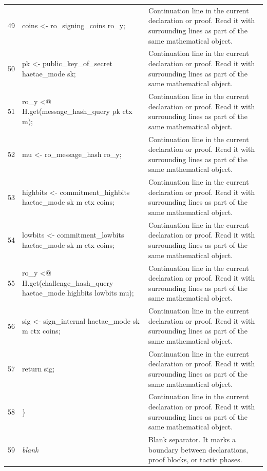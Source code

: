 \documentclass[10pt]{article}
\begin{document}
\begin{longtable}{r L{0.53\textwidth} L{0.37\textwidth}}
49 & {\ttfamily\scriptsize     coins <- ro\_signing\_coins ro\_y;} & Continuation line in the current declaration or proof.  Read it with surrounding lines as part of the same mathematical object. \\
50 & {\ttfamily\scriptsize     pk <- public\_key\_of\_secret haetae\_mode sk;} & Continuation line in the current declaration or proof.  Read it with surrounding lines as part of the same mathematical object. \\
51 & {\ttfamily\scriptsize     ro\_y <@ H.get(message\_hash\_query pk ctx m);} & Continuation line in the current declaration or proof.  Read it with surrounding lines as part of the same mathematical object. \\
52 & {\ttfamily\scriptsize     mu <- ro\_message\_hash ro\_y;} & Continuation line in the current declaration or proof.  Read it with surrounding lines as part of the same mathematical object. \\
53 & {\ttfamily\scriptsize     highbits <- commitment\_highbits haetae\_mode sk m ctx coins;} & Continuation line in the current declaration or proof.  Read it with surrounding lines as part of the same mathematical object. \\
54 & {\ttfamily\scriptsize     lowbits <- commitment\_lowbits haetae\_mode sk m ctx coins;} & Continuation line in the current declaration or proof.  Read it with surrounding lines as part of the same mathematical object. \\
55 & {\ttfamily\scriptsize     ro\_y <@ H.get(challenge\_hash\_query haetae\_mode highbits lowbits mu);} & Continuation line in the current declaration or proof.  Read it with surrounding lines as part of the same mathematical object. \\
56 & {\ttfamily\scriptsize     sig <- sign\_internal haetae\_mode sk m ctx coins;} & Continuation line in the current declaration or proof.  Read it with surrounding lines as part of the same mathematical object. \\
57 & {\ttfamily\scriptsize     return sig;} & Continuation line in the current declaration or proof.  Read it with surrounding lines as part of the same mathematical object. \\
58 & {\ttfamily\scriptsize   \}} & Continuation line in the current declaration or proof.  Read it with surrounding lines as part of the same mathematical object. \\
59 & {\ttfamily\scriptsize \emph{blank}} & Blank separator.  It marks a boundary between declarations, proof blocks, or tactic phases. \\

\end{longtable}
\end{document}

